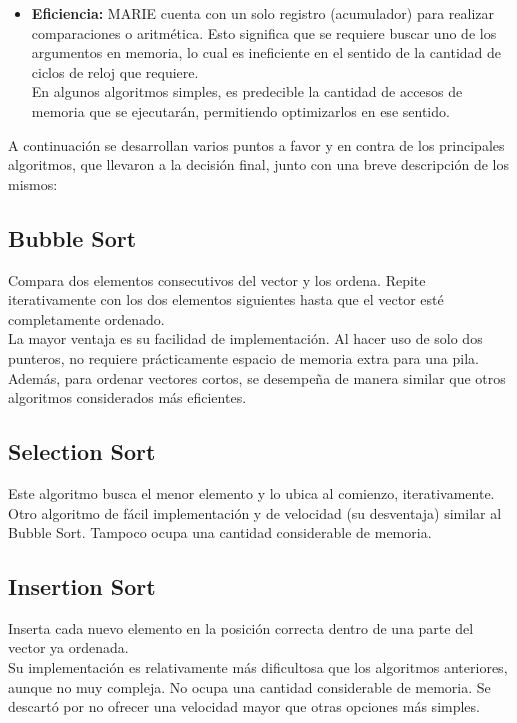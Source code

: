 \documentclass{sciposter}
\begin{document}
\begin{multicols*}{2}
\begin{itemize}
    \item \textbf{Eficiencia:} MARIE cuenta con un solo registro (acumulador) para realizar comparaciones o aritmética. Esto significa que se requiere buscar uno de los argumentos en memoria, lo cual es ineficiente en el sentido de la cantidad de ciclos de reloj que requiere.\\
    En algunos algoritmos simples, es predecible la cantidad de accesos de memoria que se ejecutarán, permitiendo optimizarlos en ese sentido.
\end{itemize}

A continuación se desarrollan varios puntos a favor y en contra de los principales algoritmos, que llevaron a la decisión final, junto con una breve descripción de los mismos:

\subsection{Bubble Sort}
Compara dos elementos consecutivos del vector y los ordena. Repite iterativamente con los dos elementos siguientes hasta que el vector esté completamente ordenado.\\
La mayor ventaja es su facilidad de implementación. Al hacer uso de solo dos punteros, no requiere prácticamente espacio de memoria extra para una pila. Además, para ordenar vectores cortos, se desempeña de manera similar que otros algoritmos considerados más eficientes.

\subsection{Selection Sort}
Este algoritmo busca el menor elemento y lo ubica al comienzo, iterativamente.\\
Otro algoritmo de fácil implementación y de velocidad (su desventaja) similar al Bubble Sort. Tampoco ocupa una cantidad considerable de memoria.

\subsection{Insertion Sort}
Inserta cada nuevo elemento en la posición correcta dentro de una parte del vector ya ordenada.\\
Su implementación es relativamente más dificultosa que los algoritmos anteriores, aunque no muy compleja. No ocupa una cantidad considerable de memoria. Se descartó por no ofrecer una velocidad mayor que otras opciones más simples.


\end{multicols*}
\end{document}
